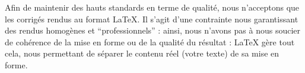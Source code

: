 ﻿Afin de maintenir des hauts standards en terme de qualité, nous n'acceptons que les corrigés rendus au format LaTeX. Il s'agit d'une contrainte nous garantissant des rendus homogènes et “professionnels” : ainsi, nous n'avons pas à nous soucier de cohérence de la mise en forme ou de la qualité du résultat : LaTeX gère tout cela, nous permettant de séparer le contenu réel (votre texte) de sa mise en forme.